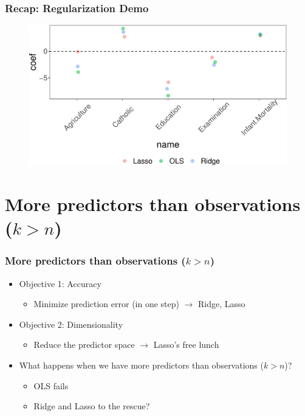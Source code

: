 \documentclass[
  shownotes,
  xcolor={svgnames},
  hyperref={colorlinks,citecolor=DarkBlue,linkcolor=DarkRed,urlcolor=DarkBlue}
  , aspectratio=169]{beamer}
\begin{document}
\begin{frame}[fragile]
\frametitle{Recap: Regularization Demo}

   \begin{figure}[H] \centering
            \captionsetup{justification=centering}
              \includegraphics[scale=0.6]{figures/comp}
 \end{figure}

\end{frame}
\section{More predictors than observations ($k>n$)}
\begin{frame}[fragile]
\frametitle{More predictors than observations ($k>n$)}

\begin{itemize}
  \item Objective 1: Accuracy
  \begin{itemize}
    \item Minimize prediction error (in one step) $\rightarrow$ Ridge, Lasso
    \end{itemize}
    \bigskip
  \item Objective 2: Dimensionality
  \begin{itemize}
    \item Reduce the predictor space $\rightarrow$ Lasso's free lunch
    \end{itemize}
\end{itemize}
\bigskip
\bigskip
\begin{itemize}
  \item What happens when we have more predictors than observations ($k>n$)?
  \begin{itemize}
   \item OLS fails
   \medskip
   \item Ridge and Lasso to the rescue?
  \end{itemize}
\end{itemize}

\end{frame}
\end{document}
